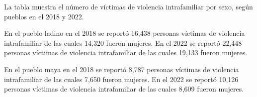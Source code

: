 La tabla muestra el número de víctimas de violencia intrafamiliar por sexo, según pueblos en el 2018 y 2022. 

En el pueblo ladino en el 2018 se reportó 16,438 personas víctimas de violencia intrafamiliar de las cuales 14,320 fueron mujeres. En el 2022 se reportó 22,448 personas víctimas de violencia intrafamiliar de las cuales 19,133 fueron mujeres.

En el pueblo maya en el 2018 se reportó 8,787 personas víctimas de violencia intrafamiliar de las cuales 7,650 fueron mujeres. En el 2022 se reportó 10,126 personas víctimas de violencia intrafamiliar de las cuales 8,609 fueron mujeres.